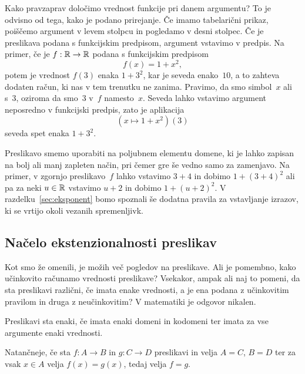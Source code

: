 Kako pravzaprav določimo vrednost funkcije pri danem argumentu? To je odvisno od tega,
kako je podano prirejanje. Če imamo tabelarični prikaz, poiščemo argument v levem stolpcu
in pogledamo v desni stolpec. Če je preslikava podana s funkcijskim predpisom, argument
vstavimo v predpis. Na primer, če je $f : \mathbb{R} \to \mathbb{R}$ podana s funkcijskim predpisom
%
\begin{equation*}
  f(x) = 1 + x^2,
\end{equation*}
%
potem je vrednost $f(3)$ enaka $1 + 3^2$, kar je seveda enako~$10$, a to zahteva dodaten
račun, ki nas v tem trenutku ne zanima. Pravimo, da smo simbol~$x$  ali
 s~$3$, oziroma da smo~$3$  v~$f$ namesto~$x$. Seveda lahko
vstavimo argument neposredno v funkcijski predpis, zato je aplikacija
%
\begin{equation*}
  (x \mapsto 1 + x^2)(3)
\end{equation*}
%
seveda spet enaka $1 + 3^2$.

Preslikavo smemo uporabiti na poljubnem elementu domene, ki je lahko zapisan na bolj ali
manj zapleten način, pri čemer gre še vedno samo za zamenjavo. Na primer, v zgornjo
preslikavo~$f$ lahko vstavimo $3 + 4$ in dobimo $1 + (3 + 4)^2$ ali pa za neki $u \in \mathbb{R}$
vstavimo $u + 2$ in dobimo $1 + (u + 2)^2$. V razdelku~\ref{sec:eksponent} bomo spoznali
še dodatna pravila za vstavljanje izrazov, ki se vrtijo okoli vezanih spremenljivk.


\subsection{Načelo ekstenzionalnosti preslikav}

Kot smo že omenili, je možih več pogledov na preslikave. Ali je pomembno, kako učinkovito
računamo vrednosti preslikave? Vsekakor, ampak ali naj to pomeni, da sta preslikavi
različni, če imata enake vrednosti, a je ena podana z učinkovitim pravilom in druga z
neučinkovitim? V matematiki je odgovor nikalen.

\begin{pravilo}
  Preslikavi sta enaki, če imata enaki domeni in kodomeni ter imata za vse argumente
  enaki vrednosti.
\end{pravilo}

Natančneje, če sta $f : A \to B$ in $g : C \to D$ preslikavi in velja $A = C$, $B = D$ ter
za vsak $x \in A$ velja $f(x) = g(x)$, tedaj velja $f = g$.

